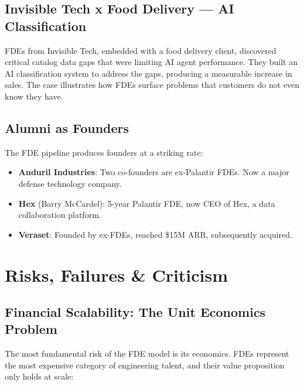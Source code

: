 \subsection{Invisible Tech x Food Delivery --- AI Classification}

FDEs from Invisible Tech, embedded with a food delivery client,
discovered critical catalog data gaps that were limiting AI agent
performance. They built an AI classification system to address the gaps,
producing a measurable increase in sales. The case illustrates how FDEs
surface problems that customers do not even know they have.

\subsection{Alumni as Founders}

The FDE pipeline produces founders at a striking rate:

\begin{itemize}
    \item \textbf{Anduril Industries}: Two co-founders are ex-Palantir
        FDEs. Now a major defense technology company.
    \item \textbf{Hex} (Barry McCardel): 5-year Palantir FDE, now CEO
        of Hex, a data collaboration platform.
    \item \textbf{Veraset}: Founded by ex-FDEs, reached \$15M ARR,
        subsequently acquired.
\end{itemize}

\section{Risks, Failures \& Criticism}

\subsection{Financial Scalability: The Unit Economics Problem}

The most fundamental risk of the FDE model is its economics. FDEs
represent the most expensive category of engineering talent, and their
value proposition only holds at scale:

